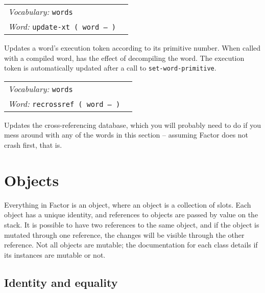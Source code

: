 \documentclass{book}
\newcommand{\vocabulary}[1]{\emph{Vocabulary:} \texttt{#1}&\\}
\newcommand{\ordinaryword}[2]{\index{\texttt{#1}}\emph{Word:} \texttt{#2}&\\}
\newcommand{\wordtable}[1]{

\begin{tabularx}{12cm}[t]{lX}
\hline
#1
\hline
\end{tabularx}

}
\begin{document}
\wordtable{
\vocabulary{words}
\ordinaryword{update-xt}{update-xt ( word -- )}

}
Updates a word's execution token according to its primitive number. When called with a compiled word, has the effect of decompiling the word. The execution token is automatically updated after a call to \texttt{set-word-primitive}.

\wordtable{
\vocabulary{words}
\ordinaryword{recrossref}{recrossref ( word -- )}

}
Updates the cross-referencing database, which you will probably need to do if you mess around with any of the words in this section -- assuming Factor does not crash first, that is.

\section{Objects}

\mutableglos

Everything in Factor is an object, where an object is a collection of slots. Each object has a unique identity, and references to objects are passed by value on the stack. It is possible to have two references to the same object, and if the object is mutated through one reference, the changes will be visible through the other reference. Not all objects are mutable; the documentation for each class details if its instances are mutable or not.

\subsection{\label{equality}Identity and equality}
\end{document}
